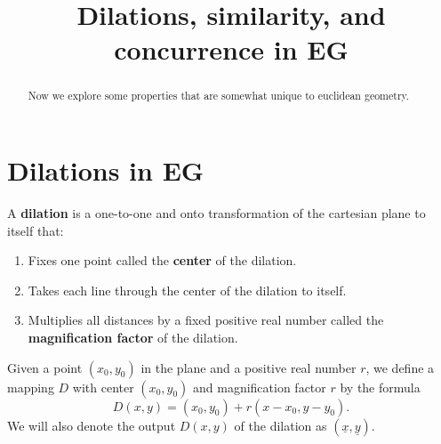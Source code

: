 \documentclass{ximera}
\title{Dilations, similarity, and concurrence in EG}
\begin{document}
\begin{abstract}
Now we explore some properties that are somewhat unique to euclidean
geometry.
\end{abstract}
\maketitle

\section*{Dilations in \textbf{EG}}

\begin{definition}
A \textbf{dilation} is a one-to-one and onto transformation of the
cartesian plane to itself that:
\begin{enumerate}
\item Fixes one point called the \textbf{center} of the dilation.
\item Takes each line through the center of the dilation to itself.
\item Multiplies all distances by a fixed positive real number called
  the \textbf{magnification factor} of the dilation.
\end{enumerate}
\end{definition}

\begin{definition}
Given a point $\left(x_{0},y_{0}\right)$ in the plane and a positive
real number $r$, we define a mapping $D$ with center $\left(
x_{0},y_{0}\right)$ and magnification factor $r$ by the formula
\[
D\left(  x,y\right)  =\left(  x_{0},y_{0}\right)  +r\left(  x-x_{0}%
,y-y_{0}\right).
\]
We will also denote the output $D\left(x,y\right)$ of the dilation
as $\left(\underline{x},\underline{y}\right)$.
\end{definition}
\end{document}
